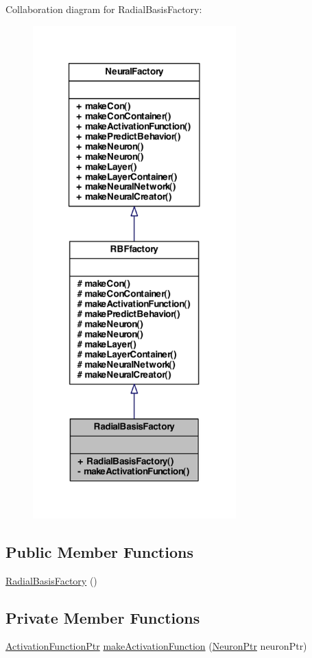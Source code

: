 Collaboration diagram for RadialBasisFactory:\nopagebreak
\begin{figure}[H]
\begin{center}
\leavevmode
\includegraphics[width=222pt]{class_radial_basis_factory__coll__graph}
\end{center}
\end{figure}
\subsection*{Public Member Functions}
\begin{DoxyCompactItemize}
\item 
\hyperlink{class_radial_basis_factory_a0c6b19106a36a0d9155e88701c982630}{RadialBasisFactory} ()
\end{DoxyCompactItemize}
\subsection*{Private Member Functions}
\begin{DoxyCompactItemize}
\item 
\hyperlink{_a_m_o_r_e_8h_a77602a0277a02e5769c3df0adc669b17}{ActivationFunctionPtr} \hyperlink{class_radial_basis_factory_ae68ec682e8f04e99e5a1560e347b7735}{makeActivationFunction} (\hyperlink{_a_m_o_r_e_8h_ac1ea936c2c7728eb382278131652fef4}{NeuronPtr} neuronPtr)
\end{DoxyCompactItemize}


